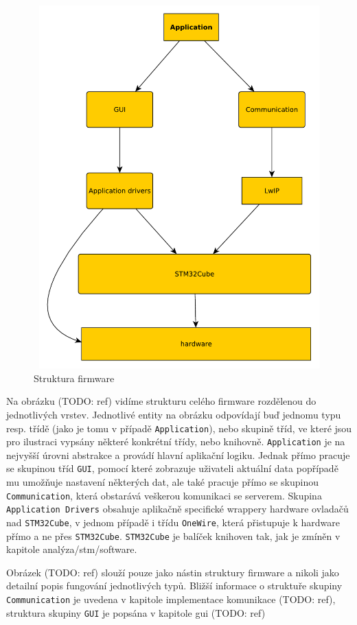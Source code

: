 \begin{figure}[tbh]\centering
\includegraphics[width=140mm, height=140mm]{../diagrams/stm_fw_struktura.pdf}
\caption{Struktura firmware}
\label{stm-fw-struktura}
\end{figure}

Na obrázku (TODO: ref) vidíme strukturu celého firmware rozdělenou do jednotlivých vrstev.
Jednotlivé entity na obrázku odpovídají buď jednomu typu resp. třídě (jako je tomu v případě \texttt{Application}),
nebo skupině tříd, ve které jsou pro ilustraci vypsány některé konkrétní třídy, nebo knihovně.
\texttt{Application} je na nejvyšší úrovni abstrakce a provádí hlavní aplikační logiku.
Jednak přímo pracuje se skupinou tříd \texttt{GUI}, pomocí které zobrazuje uživateli aktuální data
popřípadě mu umožňuje nastavení některých dat, ale také pracuje přímo se skupinou \texttt{Communication},
která obstarává veškerou komunikaci se serverem.
Skupina \texttt{Application Drivers} obsahuje aplikačně specifické wrappery hardware ovladačů nad
\texttt{STM32Cube}, v jednom případě i třídu \texttt{OneWire}, která přistupuje k hardware přímo
a ne přes \texttt{STM32Cube}.
\texttt{STM32Cube} je balíček knihoven tak, jak je zmíněn v kapitole analýza/stm/software.

Obrázek (TODO: ref) slouží pouze jako nástin struktury firmware a nikoli jako detailní popis fungování jednotlivých
typů.
Bližší informace o struktuře skupiny \texttt{Communication} je uvedena v kapitole implementace komunikace (TODO: ref),
struktura skupiny \texttt{GUI} je popsána v kapitole gui (TODO: ref)

